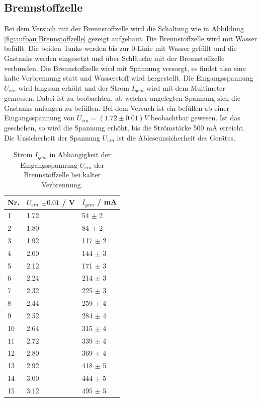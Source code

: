 \documentclass[12pt,a4paper,twoside]{article}
\begin{document}
\subsection{Brennstoffzelle}
Bei dem Versuch mit der Brennstoffzelle wird die Schaltung wie in Abbildung \ref{fig:aufbau Brennstoffzelle} gezeigt aufgebaut. 
Die Brennstoffzelle wird mit Wasser befüllt. Die beiden Tanks werden bis zur 0-Linie mit Wasser gefüllt und die Gastanks werden eingesetzt und über Schläuche mit der Brennstoffzelle verbunden. 
Die Brennstoffzelle wird mit Spannung versorgt, es findet also eine kalte Verbrennung statt und Wasserstoff wird hergestellt. 
Die Eingangsspannung $U_{ein}$ wird langsam erhöht und der Strom $I_{gem}$ wird mit dem Multimeter gemessen. 
Dabei ist zu beobachten, ab welcher angelegten Spannung sich die Gastanks anfangen zu befüllen. Bei dem Versuch ist ein befüllen ab einer Eingangsspannung von $U_{ein} = (1.72 \pm 0.01) V$ beobachtbar gewesen. 
Ist das geschehen, so wird die Spannung erhöht, bis die Strömstärke 500 mA erreicht. 
\\
Die Unsicherheit der Spannung $U_{ein}$ ist die Ableseunsicherheit des Gerätes. 
\begin{table}[H]
    \centering
    \caption{Strom $I_{gem}$ in Abhängigkeit der Eingangsspannung $U_{ein}$ der Brennstoffzelle bei kalter Verbrennung. }
    \label{tab:Messdaten Brennstoffzelle}
    \begin{tabular}{| l | l | l |}
        \hline
        Nr. & $U_{ein} $ $\pm 0.01 $  / V & $I_{gem}$ / mA  \\
        \hline
        1  & 1.72  & 54  $\pm$ 2  \\
        2  & 1.80  & 84  $\pm$ 2  \\
        3  & 1.92  & 117 $\pm$ 2  \\
        4  & 2.00  & 144 $\pm$ 3  \\
        5  & 2.12  & 171 $\pm$ 3  \\
        6  & 2.24  & 214 $\pm$ 3  \\
        7  & 2.32  & 225 $\pm$ 3  \\
        8  & 2.44  & 259 $\pm$ 4  \\
        9  & 2.52  & 284 $\pm$ 4  \\
        10 & 2.64  & 315 $\pm$ 4  \\
        11 & 2.72  & 339 $\pm$ 4  \\
        12 & 2.80  & 369 $\pm$ 4  \\
        13 & 2.92  & 418 $\pm$ 5  \\
        14 & 3.00  & 444 $\pm$ 5  \\
        15 & 3.12  & 495 $\pm$ 5  \\
        \hline  
    \end{tabular}
\end{table}
\end{document}
